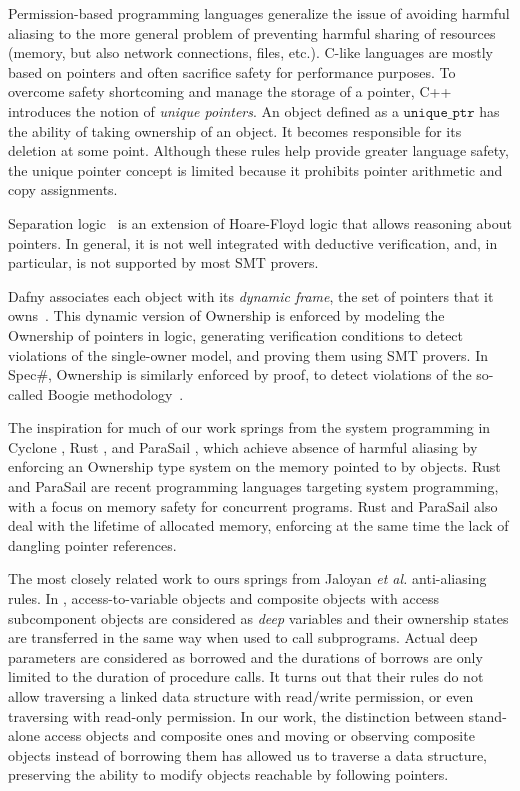 \documentclass{llncs}
\newcommand\var[1]{\ensuremath{\mathtt{#1}}}
\begin{document}
Permission-based programming languages generalize the issue of avoiding harmful aliasing to the more general problem of preventing harmful sharing of resources
(memory, but also network connections, files, etc.). C-like languages are mostly based on pointers and often sacrifice safety for performance purposes.
To overcome safety shortcoming and manage the storage of a pointer, C++ introduces the notion of \textit{unique pointers}. An object defined as a \var{unique\_ptr}
has the ability of taking ownership of an object. It becomes responsible for its deletion at some point. Although these rules help provide greater language safety, the unique
pointer concept is limited because it prohibits pointer arithmetic and copy assignments.

Separation logic~\cite{Reynolds02} is an extension of Hoare-Floyd logic that allows reasoning about pointers. In general, it is not well integrated with deductive
verification, and, in particular, is not supported by most SMT provers.


Dafny associates each object with its \emph{dynamic frame}, the set of pointers that it owns~\cite{Leino10}. This dynamic version of Ownership is
enforced by modeling the Ownership of pointers in logic, generating verification conditions to detect violations of the single-owner model, and proving
them using SMT provers. In Spec\#, Ownership is similarly enforced by proof, to detect violations of the so-called Boogie methodology~\cite{Boogie}.

The inspiration for much of our work springs from the system programming in Cyclone \cite{Grossman2002}, Rust \cite{Balasubramanian17}, and ParaSail \cite{Taft11}, which achieve absence of
harmful aliasing by enforcing an Ownership type system on the memory pointed to by objects. Rust and ParaSail are recent programming languages targeting system
programming, with a focus on memory safety for concurrent programs.
Rust and ParaSail also deal with the lifetime of allocated memory, enforcing
at the same time the lack of dangling pointer references.

The most closely related work to ours springs from Jaloyan \textit{et al.} \cite{Jaloyan18} anti-aliasing rules. In \cite{Jaloyan18}, access-to-variable objects
and composite objects with access subcomponent objects are considered as \textit{deep} variables and their ownership states are transferred in the same way when used to call subprograms.
Actual deep parameters are considered as borrowed and the durations of borrows are only limited to the duration of procedure calls.
It turns out that their rules do not allow traversing a linked data structure with read/write permission, or even traversing with read-only permission. In our work, the distinction between stand-alone access
objects and composite ones and moving or observing composite objects instead of borrowing them has allowed us to traverse a data structure, preserving the ability to modify objects reachable by following pointers.
\end{document}
